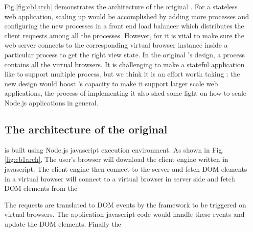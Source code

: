 
Fig.\ref{fig:cb1arch} demonstrates the architecture of the original \cb{}. %
For a stateless web application,
scaling up would be accomplished by adding more processes and configuring the new processes
in a front end load balancer which distributes the client requests among all the processes.
However, for \cb{} it is vital to make sure the web server connects to the corresponding
virtual browser instance inside a particular process to get the right view state.
In the original \cb{}'s design, a \cb{} process contains all the virtual browsers.%
It is challenging to make a stateful application like \cb{} to support multiple process, 
but we think it is an effort worth taking :
the new design would boost \cb{}'s capacity to make it support larger scale web applications,
the process of implementing it also shed some light on how to scale Node.js applications in general.

\subsection{The architecture of the original \cb{}}
\cb{} is built using Node.js javascript execution environment. %
As shown in Fig.\ref{fig:cb1arch}, 
The user's browser will download the client engine written in javascript.
The client engine then connect to the server and fetch DOM elements in a
virtual browser
will connect to a virtual browser in server side and fetch DOM
elements from the 

The requests are translated to DOM events by the framework to be triggered on virtual browsers.
The application javascript code would handle these events and update the DOM elements.
Finally the 

\architectureoverview{} 

